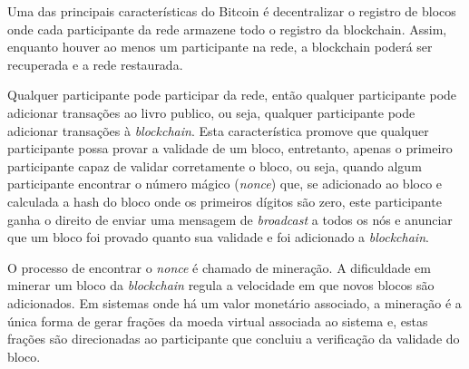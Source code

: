 \documentclass[tcc,capa]{texufpel}
\begin{document}
    Uma das principais características do Bitcoin é decentralizar o registro de blocos onde cada participante da rede armazene todo o registro da blockchain. Assim, enquanto houver ao menos um participante na rede, a blockchain poderá ser recuperada e a rede restaurada.
    
    Qualquer participante pode participar da rede, então qualquer participante pode adicionar transações ao livro publico, ou seja, qualquer participante pode adicionar transações à \textit{blockchain}. Esta característica promove que qualquer participante possa provar a validade de um bloco, entretanto, apenas o primeiro participante capaz de validar corretamente o bloco, ou seja, quando algum participante encontrar o número mágico (\textit{nonce}) que, se adicionado ao bloco e calculada a hash do bloco onde os primeiros dígitos são zero, este participante ganha o direito de enviar uma mensagem de \textit{broadcast} a todos os nós e anunciar que um bloco foi provado quanto sua validade e foi adicionado a \textit{blockchain}.
    
    O processo de encontrar o \textit{nonce} é chamado de mineração. A dificuldade em minerar um bloco da \textit{blockchain} regula a velocidade em que novos blocos são adicionados. Em sistemas onde há um valor monetário associado, a mineração é a única forma de gerar frações da moeda virtual associada ao sistema e, estas frações são direcionadas ao participante que concluiu a verificação da validade do bloco. 
    
    
    
    
\end{document}
